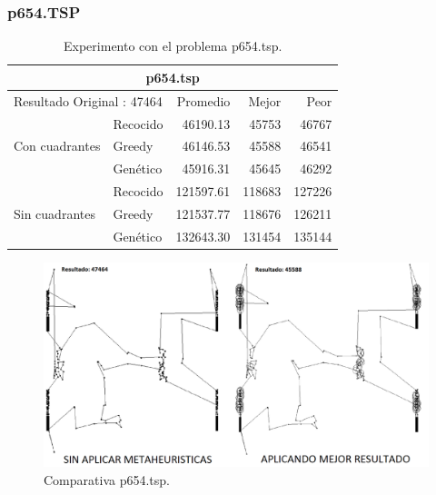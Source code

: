 \subsubsection{p654.TSP}
\begin{table}[hbtp]
 \centering 
    \caption{Experimento con el problema p654.tsp.}
	\begin{tabular}{ | l   l | r | r | r |   }
        \hline\multicolumn{5}{|c|}{ \rowcolor[gray]{0.8}p654.tsp} \\\hline
         \multicolumn{2}{|l|}{Resultado Original : 47464} & Promedio & Mejor & Peor \\ \hline
                & Recocido  & 46190.13 & 45753 & 46767  \\ 
 Con cuadrantes & Greedy    & 46146.53 & \cellcolor[gray]{0.9} 45588 & 46541  \\ 
                & Genético  &\cellcolor[gray]{0.9}  45916.31 & 45645 & \cellcolor[gray]{0.9} 46292  \\ 
                \hline
                & Recocido  & 121597.61 & \cellcolor[gray]{0.9} 118683 & 127226   \\ 
 Sin cuadrantes & Greedy    & \cellcolor[gray]{0.9} 121537.77 & 118676 & \cellcolor[gray]{0.9} 126211   \\ 
                & Genético  & 132643.30 & 131454 & 135144    \\ 
                \hline
    \end{tabular}
    \label{table:EXP_p654.tsp}
\end{table}
\begin{figure}[hbtp]
    \centering
        \includegraphics[width=1\textwidth]{PruebasResultados/Experimentos_Comparativas/p654.png}
        \caption{Comparativa p654.tsp.}
        \label{fig:p654_comparativa.png}
\end{figure}
